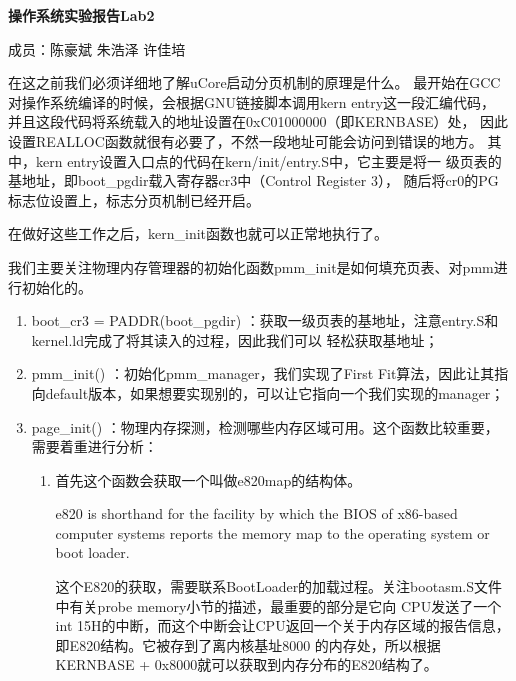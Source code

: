 \documentclass[UTF8, a4paper]{ctexart}
\begin{document}
\centerline{\textbf{\LARGE{操作系统实验报告Lab2}}}
\bigskip
\centerline{\large{成员：陈豪斌 \quad 朱浩泽 \quad 许佳培}}
\bigskip
    在这之前我们必须详细地了解uCore启动分页机制的原理是什么。
    最开始在GCC对操作系统编译的时候，会根据GNU链接脚本调用kern entry这一段汇编代码，
    并且这段代码将系统载入的地址设置在0xC01000000（即KERNBASE）处，
    因此设置REALLOC函数就很有必要了，不然一段地址可能会访问到错误的地方。
    其中，kern entry设置入口点的代码在kern/init/entry.S中，它主要是将一
    级页表的基地址，即boot\_pgdir载入寄存器cr3中（Control Register 3），
    随后将cr0的PG标志位设置上，标志分页机制已经开启。
    \par 
    在做好这些工作之后，kern\_init函数也就可以正常地执行了。
    \bigskip
    \par 
    我们主要关注物理内存管理器的初始化函数pmm\_init是如何填充页表、对pmm进行初始化的。
    \begin{enumerate}
        \item boot\_cr3 = PADDR(boot\_pgdir) ：获取一级页表的基地址，注意entry.S和kernel.ld完成了将其读入的过程，因此我们可以
              轻松获取基地址；
        \item pmm\_init() ：初始化pmm\_manager，我们实现了First Fit算法，因此让其指向default版本，如果想要实现别的，可以让它指向一个我们实现的manager；
        \item page\_init() ：物理内存探测，检测哪些内存区域可用。这个函数比较重要，需要着重进行分析：
            {
                \begin{enumerate}
                    \item 首先这个函数会获取一个叫做e820map的结构体。
                            \par
                            e820 is shorthand for the facility by which the BIOS of x86-based computer systems reports the memory map to the operating system or boot loader.
                            \par
                            这个E820的获取，需要联系BootLoader的加载过程。关注bootasm.S文件中有关probe memory小节的描述，最重要的部分是它向
                            CPU发送了一个int 15H的中断，而这个中断会让CPU返回一个关于内存区域的报告信息，即E820结构。它被存到了离内核基址8000
                            的内存处，所以根据KERNBASE + 0x8000就可以获取到内存分布的E820结构了。
                \end{enumerate}
            }
    \end{enumerate} 
\end{document}

